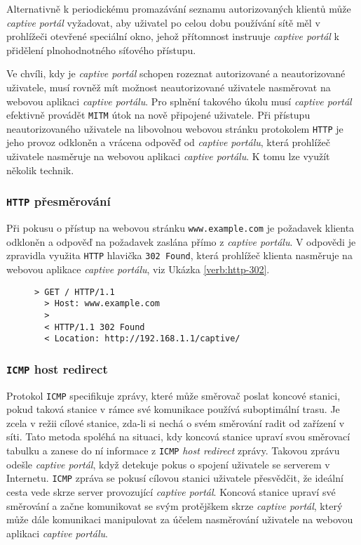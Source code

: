 \documentclass[thesis=M,czech]{FITthesis}[2012/10/20]
\renewcommand{\lstlistingname}{Ukázka kódu}
\begin{document}
Alternativně k periodickému promazávání seznamu autorizovaných klientů může \textit{captive portál} vyžadovat, aby uživatel po celou dobu používání sítě měl v prohlížeči otevřené speciální okno, jehož přítomnost instruuje \textit{captive portál} k přidělení plnohodnotného síťového přístupu.

Ve chvíli, kdy je \textit{captive portál} schopen rozeznat autorizované a neautorizované uživatele, musí rovněž mít možnost neautorizované uživatele nasměrovat na webovou aplikaci \textit{captive portálu}. Pro splnění takového úkolu musí \textit{captive portál} efektivně provádět \texttt{MITM} útok na nově připojené uživatele. Při přístupu neautorizovaného uživatele na libovolnou webovou stránku protokolem \texttt{HTTP} je jeho provoz odkloněn a vrácena odpověď od \textit{captive portálu}, která prohlížeč uživatele nasměruje na webovou aplikaci \textit{captive portálu}. K tomu lze využít několik technik.

\subsubsection{\texttt{HTTP} přesměrování}
Při pokusu o přístup na webovou stránku \texttt{www.example.com} je požadavek klienta odkloněn a odpověď na požadavek zaslána přímo z \textit{captive portálu}. V odpovědi je zpravidla využita \texttt{HTTP} hlavička \texttt{302 Found}, která prohlížeč klienta nasměruje na webovou aplikace \textit{captive portálu}, viz Ukázka \ref{verb:http-302}.

\begin{figure}[h]
  \renewcommand{\lstlistingname}{Ukázka}
  \begin{lstlisting}[label=verb:http-302, caption={Ukázka přesměrování HTTP požadavku (zkráceno)},frame=single]
  > GET / HTTP/1.1
  > Host: www.example.com
  >
  < HTTP/1.1 302 Found
  < Location: http://192.168.1.1/captive/
  \end{lstlisting}
\end{figure}

\subsubsection{\texttt{ICMP} host redirect}

Protokol \texttt{ICMP} specifikuje zprávy, které může směrovač poslat koncové stanici, pokud taková stanice v rámce své komunikace používá suboptimální trasu. Je zcela v režii cílové stanice, zda-li si nechá o svém směrování radit od zařízení v síti. Tato metoda spoléhá na situaci, kdy koncová stanice upraví svou směrovací tabulku a zanese do ní informace z \texttt{ICMP} \textit{host redirect} zprávy. Takovou zprávu odešle \textit{captive portál}, když detekuje pokus o spojení uživatele se serverem v Internetu. \texttt{ICMP} zpráva se pokusí cílovou stanici uživatele přesvědčit, že ideální cesta vede skrze server provozující \textit{captive portál}. Koncová stanice upraví své směrování a začne komunikovat se svým protějškem skrze \textit{captive portál}, který může dále komunikaci manipulovat za účelem nasměrování uživatele na webovou aplikaci \textit{captive portálu}.
\end{document}
